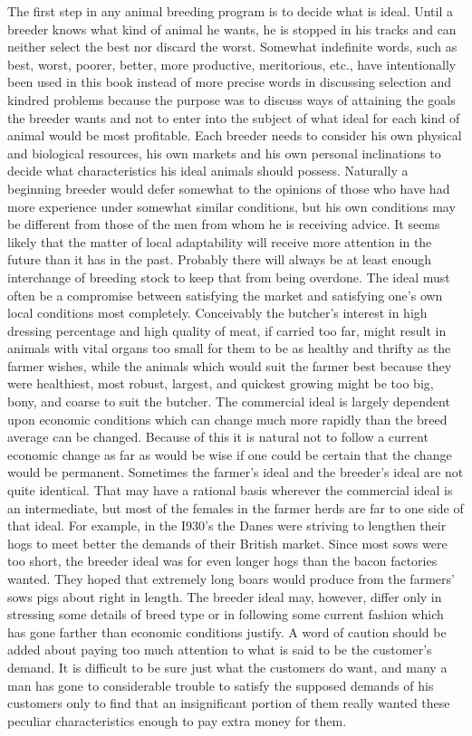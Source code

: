 The first step in any animal breeding program is to decide what is
ideal. Until a breeder knows what kind of animal he wants, he is
stopped in his tracks and can neither select the best nor discard the
worst. Somewhat indefinite words, such as best, worst, poorer, better,
more productive, meritorious, etc., have intentionally been used in this
book instead of more precise words in discussing selection and kindred
problems because the purpose was to discuss ways of attaining the goals
the breeder wants and not to enter into the subject of what ideal for
each kind of animal would be most profitable. Each breeder needs to
consider his own physical and biological resources, his own markets and
his own personal inclinations to decide what characteristics his ideal
animals should possess. Naturally a beginning breeder would defer
somewhat to the opinions of those who have had more experience
under somewhat similar conditions, but his own conditions may be different
from those of the men from whom he is receiving advice. It seems
likely that the matter of local adaptability will receive more attention
in the future than it has in the past. Probably there will always be at
least enough interchange of breeding stock to keep that from being
overdone. The ideal must often be a compromise between satisfying
the market and satisfying one's own local conditions most completely.
Conceivably the butcher's interest in high dressing percentage and high
quality of meat, if carried too far, might result in animals with vital organs
too small for them to be as healthy and thrifty as the farmer wishes,
while the animals which would suit the farmer best because they were
healthiest, most robust, largest, and quickest growing might be too big,
bony, and coarse to suit the butcher. The commercial ideal is largely dependent
upon economic conditions which can change much more rapidly
than the breed average can be changed. Because of this it is natural
not to follow a current economic change as far as would be wise if one
could be certain that the change would be permanent. Sometimes the
farmer's ideal and the breeder's ideal are not quite identical. That may
have a rational basis wherever the commercial ideal is an intermediate,
but most of the females in the farmer herds are far to one side of that
ideal. For example, in the I930's the Danes were striving to lengthen
their hogs to meet better the demands of their British market. Since
most sows were too short, the breeder ideal was for even longer hogs
than the bacon factories wanted. They hoped that extremely long boars
would produce from the farmers' sows pigs about right in length. The
breeder ideal may, however, differ only in stressing some details of breed
type or in following some current fashion which has gone farther than
economic conditions justify. A word of caution should be added about
paying too much attention to what is said to be the customer's demand.
It is difficult to be sure just what the customers do want, and many a
man has gone to considerable trouble to satisfy the supposed demands
of his customers only to find that an insignificant portion of them really
wanted these peculiar characteristics enough to pay extra money for
them.


